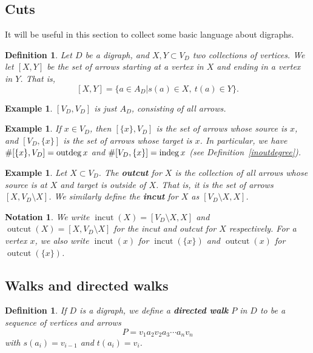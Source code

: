 \documentclass[12pt]{report}
\theoremstyle{plain}
\newtheorem{defn}[thm]{Definition}
\newtheorem{notn}[thm]{Notation}
\newtheorem{ex}[thm]{Example}
\newcommand{\oper}[1]{\operatorname{#1}}
\newcommand{\Xb}[1]{\textbf{#1}\index{#1}}
\begin{document}
\subsection{Cuts}

It will be useful in this section to collect some basic language
about digraphs. 

\begin{defn}
Let $D$ be a digraph, and $X, Y \subset V_D$ two collections of vertices.
We let $[X, Y]$ be the set of arrows starting at a vertex in $X$ and ending
in a vertex in $Y$. That is,
\[ [X, Y] = \{a \in A_D | s(a) \in X, \ t(a) \in Y\}. \]
\end{defn}

\begin{ex}
$[V_D, V_D]$ is just $A_D$, consisting of all arrows.
\end{ex}

\begin{ex}
If $x \in V_D$, then $[\{x\}, V_D]$ is the set of arrows whose source is
$x$, and $[V_D, \{x\}]$ is the set of arrows whose target is $x$. In
particular, we have $\#[\{x\}, V_D] = \outdeg x$ and $\#[V_D, \{x\}] =
\indeg x$ (see Definition~\ref{inoutdegree}).
\end{ex}

\begin{ex} \label{inoutcuts}
Let $X \subset V_D$. The \Xb{outcut} for $X$ is the collection of all
arrows whose source is at $X$ and target is outside of $X$. That is, it is
the set of arrows $[X, V_D \setminus X]$. We similarly define the
\Xb{incut} for $X$ as $[V_D \setminus X, X]$.
\end{ex}

\newcommand{\outcut}{\oper{outcut}}
\newcommand{\incut}{\oper{incut}}

\begin{notn}
We write $\incut(X) = [V_D \setminus X, X]$ and $\outcut(X) = [X, V_D
\setminus X]$ for the incut and outcut for $X$ respectively. For a vertex
$x$, we also write $\incut(x)$ for $\incut(\{x\})$ and $\outcut(x)$ for
$\outcut(\{x\})$.
\end{notn}

\subsection{Walks and directed walks}

\begin{defn}
If $D$ is a digraph, we define a \textbf{directed
walk} $P$ in $D$ to be a sequence of vertices and
arrows
\[P = v_1 a_2 v_2 a_3 \cdots a_n v_n \]
with $s(a_i) = v_{i-1}$ and $t(a_i) = v_i$.
\end{defn}
\end{document}
